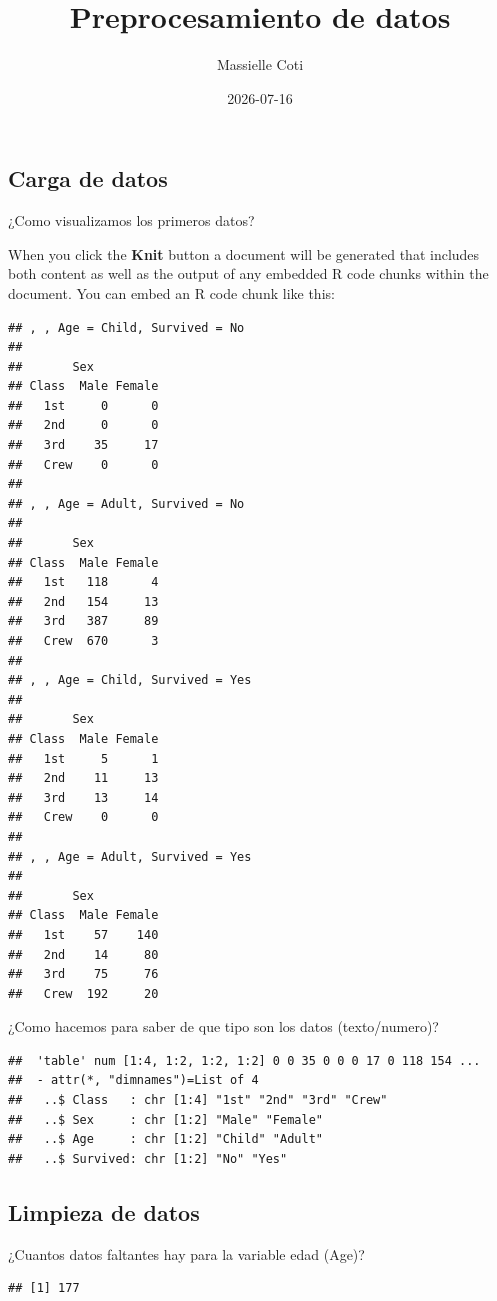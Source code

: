 \documentclass[
]{article}
\title{Preprocesamiento de datos}
\author{Massielle Coti}
\date{2026-07-16}
\begin{document}
\maketitle

\subsection{Carga de datos}\label{carga-de-datos}

¿Como visualizamos los primeros datos?

When you click the \textbf{Knit} button a document will be generated
that includes both content as well as the output of any embedded R code
chunks within the document. You can embed an R code chunk like this:

\begin{verbatim}
## , , Age = Child, Survived = No
## 
##       Sex
## Class  Male Female
##   1st     0      0
##   2nd     0      0
##   3rd    35     17
##   Crew    0      0
## 
## , , Age = Adult, Survived = No
## 
##       Sex
## Class  Male Female
##   1st   118      4
##   2nd   154     13
##   3rd   387     89
##   Crew  670      3
## 
## , , Age = Child, Survived = Yes
## 
##       Sex
## Class  Male Female
##   1st     5      1
##   2nd    11     13
##   3rd    13     14
##   Crew    0      0
## 
## , , Age = Adult, Survived = Yes
## 
##       Sex
## Class  Male Female
##   1st    57    140
##   2nd    14     80
##   3rd    75     76
##   Crew  192     20
\end{verbatim}

¿Como hacemos para saber de que tipo son los datos (texto/numero)?

\begin{verbatim}
##  'table' num [1:4, 1:2, 1:2, 1:2] 0 0 35 0 0 0 17 0 118 154 ...
##  - attr(*, "dimnames")=List of 4
##   ..$ Class   : chr [1:4] "1st" "2nd" "3rd" "Crew"
##   ..$ Sex     : chr [1:2] "Male" "Female"
##   ..$ Age     : chr [1:2] "Child" "Adult"
##   ..$ Survived: chr [1:2] "No" "Yes"
\end{verbatim}

\subsection{Limpieza de datos}\label{limpieza-de-datos}

¿Cuantos datos faltantes hay para la variable edad (Age)?

\begin{verbatim}
## [1] 177
\end{verbatim}
\end{document}
